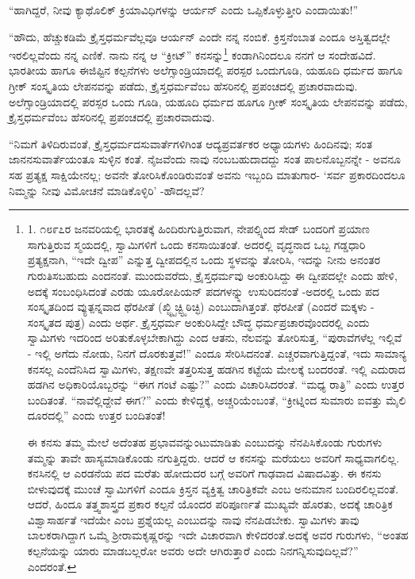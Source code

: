 “ಹಾಗಿದ್ದರೆ, ನೀವು ಕ್ಯಾಥೊಲಿಕ್ ಕ್ರಿಯಾವಿಧಿಗಳನ್ನು ಆರ್ಯನ್ ಎಂದು ಒಪ್ಪಿಕೊಳ್ಳುತ್ತೀರಿ ಎಂದಾಯಿತು!”

“ಹೌದು, ಹೆಚ್ಚುಕಡಿಮೆ ಕ್ರೈಸ್ತಧರ್ಮವೆಲ್ಲವೂ ಆರ್ಯನ್ ಎಂದೇ ನನ್ನ ನಂಬಿಕೆ. ಕ್ರಿಸ್ತನೆಂಬಾತ ಎಂದೂ ಅಸ್ತಿತ್ವದಲ್ಲೇ ಇರಲಿಲ್ಲವೆಂದು ನನ್ನ ಎಣಿಕೆ. ನಾನು ನನ್ನ ಆ “ಕ್ರೀಟ್” ಕನಸನ್ನು\footnote{1. ೧೮೯೭ರ ಜನವರಿಯಲ್ಲಿ ಭಾರತಕ್ಕೆ ಹಿಂದಿರುಗುತ್ತಿರುವಾಗ, ನೇಪಲ್ಸ್ನಿಂದ ಸೇಡ್ ಬಂದರಿಗೆ ಪ್ರಯಾಣ ಸಾಗುತ್ತಿರುವ ಸ್ಮಯದಲ್ಲಿ, ಸ್ವಾಮಿಗಳಿಗೆ ಒಂದು ಕನಸಾಯಿತಂತೆ. ಅದರಲ್ಲಿ ವೃದ್ಧನಾದ ಒಬ್ಬ ಗಡ್ಡಧಾರಿ ಪ್ರತ್ಯಕ್ಷನಾಗಿ, “ಇದೇ ದ್ವೀಪ” ಎನ್ನುತ್ತ ದ್ವೀಪದಲ್ಲಿನ ಒಂದು ಸ್ಥಳವನ್ನು ತೋರಿಸಿ, ಇದನ್ನು ನೀನು ಅನಂತರ ಗುರುತಿಸಬಹುದು ಎಂದನಂತೆ. ಮುಂದುವರೆದು, ಕ್ರೈಸ್ತಧರ್ಮವು ಅಂಕುರಿಸಿದ್ದು ಈ ದ್ವೀಪದಲ್ಲೇ ಎಂದು ಹೇಳಿ, ಅದಕ್ಕೆ ಸಂಬಂಧಿಸಿದಂತೆ ಎರಡು ಯೂರೋಪಿಯನ್ ಪದಗಳನ್ನ್ನು ಉಸುರಿದನಂತೆ -ಅದರಲ್ಲಿ ಒಂದು ಪದ ಸಂಸ್ಕೃತದಿಂದ ವ್ಯುತ್ಪನ್ನವಾದ ಥೆರಪೀತೆ (ಖ್ಜ್ಛ್ಟಿಚ್ಟ್ಛ್ಠಿಠಿಚ್ಛಿ) ಎಂಬುದಾಗಿತ್ತಂತೆ. ಥೆರಪೀತೆ (ಎಂದರೆ ಮಕ್ಕಳು - ಸಂಸ್ಕೃತದ ಪುತ್ರ) ಎಂದು ಅರ್ಥ. ಕ್ರೈಸ್ತಧರ್ಮ ಅಂಕುರಿಸಿದ್ದೇ ಬೌದ್ಧ ಧರ್ಮಪ್ರಚಾರವೊಂದರಲ್ಲಿ ಎಂದು ಸ್ವಾಮಿಗಳು ಇದರಿಂದ ಅರಿತುಕೊಳ್ಳಬೇಕಾಗಿದ್ದು ಎಂದ ಆತನು, ನೆಲವನ್ನು ತೋರಿಸುತ್ತ, “ಪುರಾವೆಗಳೆಲ್ಲ ಇಲ್ಲಿವೆ - ಇಲ್ಲಿ ಅಗೆದು ನೋಡು, ನಿನಗೆ ದೊರಕುತ್ತವೆ!” ಎಂದೂ ಸೇರಿಸಿದನಂತೆ. ಎಚ್ಚರವಾಗುತ್ತಿದ್ದಂತೆ, ಇದು ಸಾಮಾನ್ಯ ಕನಸಲ್ಲ ಎಂದೆನಿಸಿದ ಸ್ವಾಮಿಗಳು, ತಕ್ಷಣವೇ ತತ್ತರಿಸುತ್ತ ಹಡಗಿನ ಕಟ್ಟೆಯ ಮೇಲಕ್ಕೆ ಬಂದರಂತೆ. ಇಲ್ಲಿ ಎದುರಾದ ಹಡಗಿನ ಅಧಿಕಾರಿಯೊಬ್ಬರನ್ನು “ಈಗ ಗಂಟೆ ಎಷ್ಟು?” ಎಂದು ವಿಚಾರಿಸಿದರಂತೆ. “ಮಧ್ಯ ರಾತ್ರಿ” ಎಂದು ಉತ್ತರ ಬಂದಿತಂತೆ. “ನಾವೆಲ್ಲಿದ್ದೇವೆ ಈಗ?” ಎಂದು ಕೇಳಿದ್ದಕ್ಕೆ, ಅಚ್ಚರಿಯೆಂಬಂತೆ, “ಕ್ರೀಟ್ನಿಂದ ಸುಮಾರು ಐವತ್ತು ಮೈಲಿ ದೂರದಲ್ಲಿ” ಎಂದು ಉತ್ತರ ಬಂದಿತಂತೆ!

ಈ ಕನಸು ತಮ್ಮ ಮೇಲೆ ಅದೆಂತಹ ಪ್ರಭಾವವನ್ನುಂಟುಮಾಡಿತು ಎಂಬುದನ್ನು ನೆನಪಿಸಿಕೊಂಡು ಗುರುಗಳು ತಮ್ಮನ್ನು ತಾವೇ ಹಾಸ್ಯಮಾಡಿಕೊಂಡು ನಗುತ್ತಿದ್ದರು. ಆದರೆ ಆ ಕನಸನ್ನು ಮರೆಯಲು ಅವರಿಗೆ ಸಾಧ್ಯವಾಗಲಿಲ್ಲ. ಕನಸಿನಲ್ಲಿ ಆ ಎರಡನೆಯ ಪದ ಮರೆತು ಹೋದುದರ ಬಗ್ಗೆ ಅವರಿಗೆ ಗಾಢವಾದ ವಿಷಾದವಿತ್ತು. ಈ ಕನಸು ಬೀಳುವುದಕ್ಕೆ ಮುಂಚೆ ಸ್ವಾಮಿಗಳಿಗೆ ಎಂದೂ ಕ್ರಿಸ್ತನ ವ್ಯಕ್ತಿತ್ವ ಚಾರಿತ್ರಿಕವೇ ಎಂಬ ಅನುಮಾನ ಬಂದಿರಲಿಲ್ಲವಂತೆ. ಆದರೆ, ಹಿಂದೂ ತತ್ತ್ವಶಾಸ್ತ್ರದ ಪ್ರಕಾರ ಕಲ್ಪನೆ ಯೊಂದರ ಪರಿಪೂರ್ಣತೆ ಮುಖ್ಯವೇ ಹೊರತು, ಅದಕ್ಕೆ ಚಾರಿತ್ರಿಕ ವಿಶ್ವಾಸಾರ್ಹತೆ ಇದೆಯೇ ಎಂಬ ಪ್ರಶ್ನೆಯಲ್ಲ ಎಂಬುದನ್ನು ನಾವು ನೆನಪಿಡಬೇಕು. ಸ್ವಾಮಿಗಳು ತಾವು ಬಾಲಕರಾಗಿದ್ದಾಗ ಒಮ್ಮೆ ಶ‍್ರೀರಾಮಕೃಷ್ಣರನ್ನು ಇದೇ ವಿಚಾರವಾಗಿ ಕೇಳಿದರಂತೆ.ಅದಕ್ಕೆ ಅವರ ಗುರುಗಳು, “ಅಂತಹ ಕಲ್ಪನೆಯನ್ನು ಯಾರು ಮಾಡಬಲ್ಲರೋ ಅವರು ಅದೇ ಆಗಿರುತ್ತಾರೆ ಎಂದು ನಿನಗನ್ನಿಸುವುದಿಲ್ಲವೆ?” ಎಂದರಂತೆ.} ಕಂಡಾಗಿನಿಂದಲೂ ನನಗೆ ಆ ಸಂದೇಹವಿದೆ. ಭಾರತೀಯ ಹಾಗೂ ಈಜಿಪ್ಟಿನ ಕಲ್ಪನೆಗಳು ಅಲೆಗ್ಸಾಂಡ್ರಿಯಾದಲ್ಲಿ ಪರಸ್ಪರ ಒಂದುಗೂಡಿ, ಯಹೂದಿ ಧರ್ಮದ ಹಾಗೂ ಗ್ರೀಕ್ ಸಂಸ್ಕೃತಿಯ ಲೇಪನವನ್ನು ಪಡೆದು, ಕ್ರೈಸ್ತಧರ್ಮವೆಂಬ ಹೆಸರಿನಲ್ಲಿ ಪ್ರಪಂಚದಲ್ಲಿ ಪ್ರಚಾರವಾದುವು. ಅಲೆಗ್ಸಾಂಡ್ರಿಯಾದಲ್ಲಿ ಪರಸ್ಪರ ಒಂದು ಗೂಡಿ, ಯಹೂದಿ ಧರ್ಮದ ಹೂಗೂ ಗ್ರೀಕ್ ಸಂಸ್ಕೃತಿಯ ಲೇಪನವನ್ನು ಪಡೆದು, ಕ್ರೈಸ್ತಧರ್ಮವೆಂಬ ಹೆಸರಿನಲ್ಲಿ ಪ್ರಪಂಚದಲ್ಲಿ ಪ್ರಚಾರವಾದುವು.

“ನಿಮಗೆ ತಿಳಿದಿರುವಂತೆ, ಕ್ರೈಸ್ತಧರ್ಮದಸುವಾರ್ತೆಗಳಿಗಿಂತ ಆದ್ಯಪ್ರವರ್ತಕರ ಅಧ್ಯಾಯಗಳು ಹಿಂದಿನವು; ಸಂತ ಜಾನನಸುವಾರ್ತೆಯಂತೂ ಸುಳ್ಳಿನ ಕಂತೆ. ನೈಜವೆಂದು ನಾವು ನಂಬಬಹುದಾದದ್ದು ಸಂತ ಪಾಲನೊಬ್ಬನನ್ನೇ - ಅವನೂ ಸಹ ಪ್ರತ್ಯಕ್ಷ ಸಾಕ್ಷಿಯೇನಲ್ಲ; ಅವನೇ ತೋರಿಸಿಕೊಂಡಿರುವಂತೆ ಅವನು ಇಬ್ಬಂದಿ ಮಾತುಗಾರ- ‘ಸರ್ವ ಪ್ರಕಾರದಿಂದಲೂ ನಿಮ್ಮನ್ನು ನೀವು ವಿಮೋಚನೆ ಮಾಡಿಕೊಳ್ಳಿರಿ’ -ಹೌದಲ್ಲವೆ?

